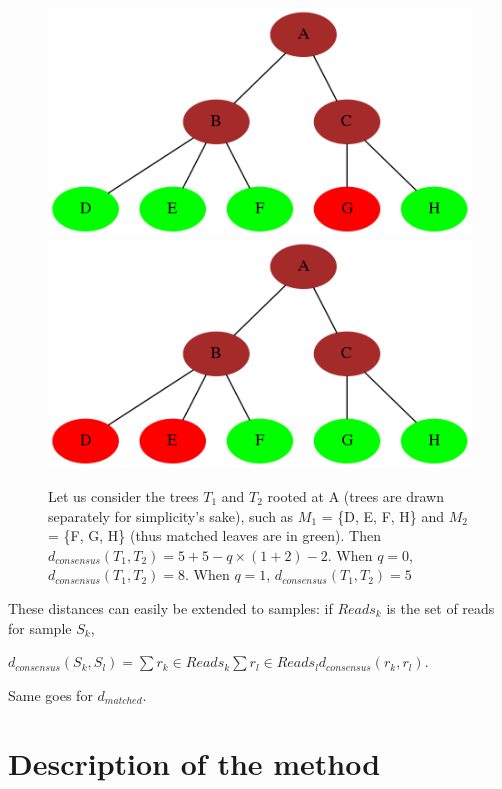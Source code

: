 \documentclass{report}
\begin{document}
\begin{itemize}
\begin{figure}[H]
\centering
\subfigure\includegraphics[scale=0.35]{illustrations/distance2-1.png}
\subfigure\includegraphics[scale=0.35]{illustrations/distance2-2.png}
\caption{Let us consider the trees $T_{1}$ and $T_{2}$ rooted at A (trees are drawn separately for simplicity's sake), such as $M_{1}$ = \{D, E, F, H\} and $M_{2}$ = \{F, G, H\} (thus matched leaves are in green). Then $d_{consensus}(T_{1},T_{2}) = 5 + 5 - q \times (1 + 2) - 2$. When $q = 0$, $d_{consensus}(T_{1},T_{2}) = 8$. When $q = 1$, $d_{consensus}(T_{1},T_{2}) = 5$}
\end{figure}

       \end{itemize}
\item These distances can easily be extended to samples: if $Reads_{k}$ is the set of reads for sample $S_{k}$,\\
\begin{center}
$d_{consensus}(S_{k},S_{l}) = \sum{r_{k} \in Reads_{k}}{\sum{r_{l} \in Reads_{l}}{d_{consensus}(r_{k},r_{l})}}$.
\end{center} 

Same goes for $d_{matched}$.

\section{Description of the method}
\end{document}
